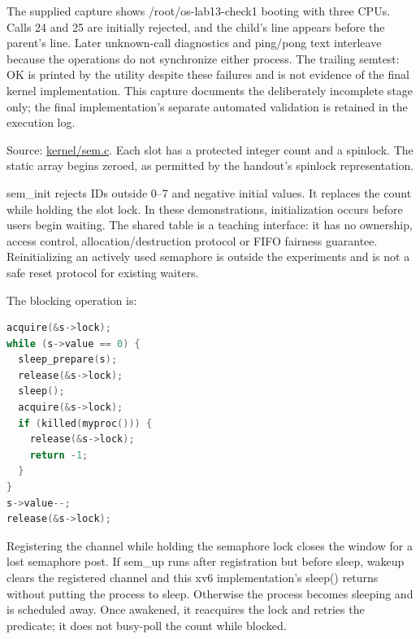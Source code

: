 \documentclass[12pt,a4paper]{article}
\makeatletter
\renewcommand\subsection{\@startsection{subsection}{2}{0pt}{12pt}{5pt}{\normalfont\large\bfseries}}
\makeatother
\begin{document}
The supplied capture shows
{\ttfamily\fontsize{10}{12}\selectfont /root/os-lab\allowbreak{}13-check1}
booting with three CPUs. Calls 24 and 25 are initially rejected, and the
child's line appears before the parent's line. Later unknown-call
diagnostics and ping/pong text interleave because the operations do not
synchronize either process. The trailing
{\ttfamily\fontsize{10}{12}\selectfont semtest: OK} is printed by the
utility despite these failures and is not evidence of the final kernel
implementation. This capture documents the deliberately incomplete stage
only; the final implementation's separate automated validation is
retained in the execution log.

\subsection{Part 2 --- Kernel semaphore
operations}\label{part-2-kernel-semaphore-operations}

Source:
\href{https://github.com/igortacu/OS/blob/main/xv6/kernel/sem.c}{kernel/sem.c}.
Each slot has a protected integer count and a spinlock. The static array
begins zeroed, as permitted by the handout's spinlock representation.

{\ttfamily\fontsize{10}{12}\selectfont sem\_init} rejects IDs outside
0--7 and negative initial values. It replaces the count while holding
the slot lock. In these demonstrations, initialization occurs before
users begin waiting. The shared table is a teaching interface: it has no
ownership, access control, allocation/destruction protocol or FIFO
fairness guarantee. Reinitializing an actively used semaphore is outside
the experiments and is not a safe reset protocol for existing waiters.

The blocking operation is:

\par\noindent\begin{minipage}{\linewidth}

\begin{lstlisting}[language=C]
acquire(&s->lock);
while (s->value == 0) {
  sleep_prepare(s);
  release(&s->lock);
  sleep();
  acquire(&s->lock);
  if (killed(myproc())) {
    release(&s->lock);
    return -1;
  }
}
s->value--;
release(&s->lock);
\end{lstlisting}

\end{minipage}\par

Registering the channel while holding the semaphore lock closes the
window for a lost semaphore post. If
{\ttfamily\fontsize{10}{12}\selectfont sem\_up} runs after registration
but before {\ttfamily\fontsize{10}{12}\selectfont sleep},
{\ttfamily\fontsize{10}{12}\selectfont wakeup} clears the registered
channel and this xv6 implementation's
{\ttfamily\fontsize{10}{12}\selectfont sleep()} returns without putting
the process to sleep. Otherwise the process becomes sleeping and is
scheduled away. Once awakened, it reacquires the lock and retries the
predicate; it does not busy-poll the count while blocked.
\end{document}
